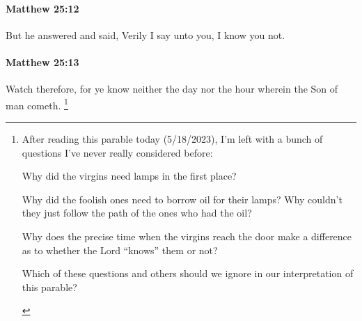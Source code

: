 		\paragraph{Matthew 25:12} %
			\label{MATTHEW-25-12}

			But he answered and said, Verily I say unto you, I know you not.

			\begin{framed}
			\scriptsize
				\begin{compactdesc}
					\item[SBLG] 
				\end{compactdesc}
			\end{framed}

		\paragraph{Matthew 25:13} %
			\label{MATTHEW-25-13}

			Watch therefore, for ye know neither the day nor the hour wherein the Son of man cometh.%
				\footnote{%
					After reading this parable today (5/18/2023), I'm left with a bunch of questions I've never really considered before:
						\begin{compactitem}
							\item Why did the virgins need lamps in the first place?
							\item Why did the foolish ones need to borrow oil for their lamps? Why couldn't they just follow the path of the ones who had the oil?
							\item Why does the precise time when the virgins reach the door make a difference as to whether the Lord ``knows'' them or not? 
							\item Which of these questions and others should we ignore in our interpretation of this parable?
						\end{compactitem}
					}


